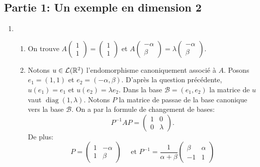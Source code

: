 \subsection*{Partie 1: Un exemple en dimension 2}


\begin{enumerate}

\item \begin{enumerate}
           \item On trouve $A\begin{pmatrix}
                              1 \\ 1
                             \end{pmatrix} = \begin{pmatrix}
                                                   1\\
                                                   1
                                              \end{pmatrix}$ et $A\begin{pmatrix}
                                                                      -\alpha \\
                                                                      \beta
                                                                   \end{pmatrix} = \lambda \begin{pmatrix}
                                                                                           -\alpha \\
                                                                                           \beta
                                                                                    \end{pmatrix}$.
       \item Notons $u\in \mathcal{L}(\mathbb{R}^{2})$ l'endomorphisme canoniquement associé à $A$. Posons $e_{1} = (1, 1)$ et $e_{2} = (-\alpha, \beta)$. D'après la question précédente, $u(e_{1}) = e_{1}$ et 
       $u(e_{2}) = \lambda e_{2}$. Dans la base $\mathcal{B} = (e_{1}, e_{2})$ la matrice de $u$ vaut $\operatorname{diag}(1, \lambda)$. Notons $P$ la matrice de passae de la base canonique vers la base $\mathcal{B}$. 
       On a par la formule de changement de bases:
       \[ P^{-1}AP = \begin{pmatrix}
                      1 & 0\\
                      0 & \lambda
                     \end{pmatrix}.\]
         De plus:
         \[ P = \begin{pmatrix}
                 1 & -\alpha \\
                 1 & \beta
                \end{pmatrix}\quad \text{ et } P^{-1} = \frac{1}{\alpha + \beta}\begin{pmatrix}
                                                                                      \beta & \alpha \\
                                                                                      -1 & 1
          

\end{pmatrix}\]
\end{enumerate}
\end{enumerate}
